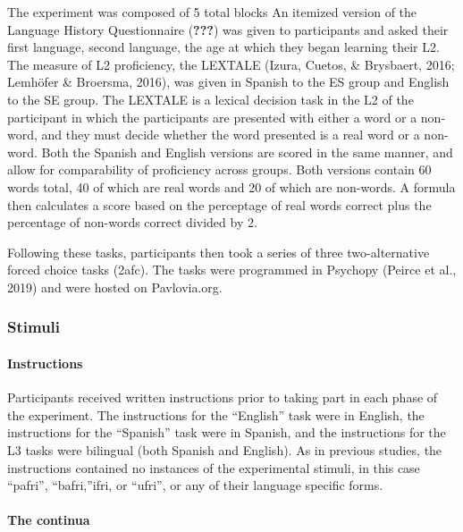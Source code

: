 \documentclass[
  english,
  man]{apa6}
\let\oldparagraph\paragraph
\renewcommand{\paragraph}[1]{\oldparagraph{#1}\mbox{}}
\begin{document}
The experiment was composed of 5 total blocks
An itemized version of the Language History Questionnaire ({\textbf{???}}) was given to participants and asked their first language, second language, the age at which they began learning their L2.
The measure of L2 proficiency, the LEXTALE (Izura, Cuetos, \& Brysbaert, 2016; Lemhöfer \& Broersma, 2016), was given in Spanish to the ES group and English to the SE group.
The LEXTALE is a lexical decision task in the L2 of the participant in which the participants are presented with either a word or a non-word, and they must decide whether the word presented is a real word or a non-word.
Both the Spanish and English versions are scored in the same manner, and allow for comparability of proficiency across groups. Both versions contain 60 words total, 40 of which are real words and 20 of which are non-words. A formula then calculates a score based on the perceptage of real words correct plus the percentage of non-words correct divided by 2.

Following these tasks, participants then took a series of three two-alternative forced choice tasks (2afc).
The tasks were programmed in Psychopy (Peirce et al., 2019) and were hosted on Pavlovia.org.

\hypertarget{stimuli}{%
\subsubsection{Stimuli}\label{stimuli}}

\hypertarget{instructions}{%
\paragraph{Instructions}\label{instructions}}

Participants received written instructions prior to taking part in each phase of the experiment. The instructions for the \enquote{English} task were in English, the instructions for the \enquote{Spanish} task were in Spanish, and the instructions for the L3 tasks were bilingual (both Spanish and English). As in previous studies, the instructions contained no instances of the experimental stimuli, in this case \enquote{pafri}, \enquote{bafri,}ifri, or \enquote{ufri}, or any of their language specific forms.

\hypertarget{the-continua}{%
\paragraph{The continua}\label{the-continua}}
\end{document}
